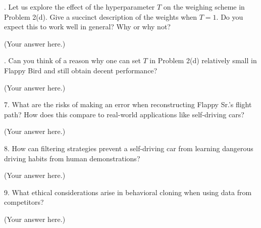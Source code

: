 \documentclass{article}
\begin{document}
        . Let us explore the effect of the hyperparameter $T$ on the weighing scheme in Problem 2(d). Give a succinct description of the weights when $T = 1$. Do you expect this to work well in general? Why or why not?
        \begin{solution}
            (Your answer here.)
        \end{solution}
        
        . Can you think of a reason why one can set $T$ in Problem 2(d) relatively small in Flappy Bird and still obtain decent performance?
        \begin{solution}
            (Your answer here.)
        \end{solution}
        7. What are the risks of making an error when reconstructing Flappy Sr.’s flight path? How does this compare to real-world applications like self-driving cars?
        \begin{solution}
            (Your answer here.)
        \end{solution}
        8. How can filtering strategies prevent a self-driving car from learning dangerous driving habits from human demonstrations?
        \begin{solution}
            (Your answer here.)
        \end{solution}
        9. What ethical considerations arise in behavioral cloning when using data from competitors?
        \begin{solution}
            (Your answer here.)
        \end{solution}
        

 
\end{document}
